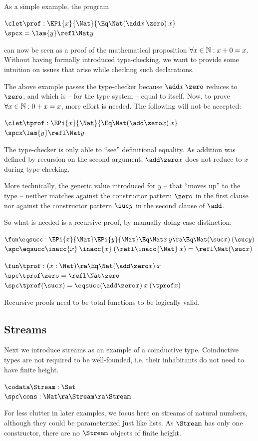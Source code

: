 \noindent As a simple example, the program
\begin{bsp}
$ \clet \prof : \EPi{x}{\Nat}{\Eq \Nat (\add x \: \zero)\: x} $ \\ 
$ \spcx = \lam{y}\refl \Nat y$ 
\end{bsp}
can now be seen as a proof of the mathematical proposition $ \forall x \in \mathbb{N} : x  + 0 = x $. Without having formally introduced type-checking, we want to provide some intuition on issues that arise while checking such declarations.

The above example passes the type-checker because $\add x \: \zero$ reduces to $\zero$, and which is -- for the type system -- equal to itself. 
Now, to prove $ \forall x \in \mathbb{N} : 0 +  x = x $, more effort is needed.
The following will not be accepted:
\begin{bsp}
$ \clet \tprof : \EPi{x}{\Nat}{\Eq \Nat (\add \zero x) \: x} $ \\ 
$ \spcx \lam{y} \refl \Nat y$ 
\end{bsp}
The type-checker is only able to ``see'' definitional equality.
As addition was defined by recursion on the second argument, $\add \zero x$ does not reduce to $x$ during type-checking.

More technically, the generic value introduced for $y$ -- that ``moves up'' to the type -- neither matches against the constructor pattern $\zero$ in the first clause
nor against the constructor pattern $\suc y$ in the second clause of $\add$.

So what is needed is a recursive proof, by manually doing case distinction:
\begin{bsp}
$\fun \eqsucc : \EPi{x}{\Nat}\EPi{y}{\Nat} \Eq \Nat x \: y \ra \Eq \Nat (\suc x) \: (\suc y)$ \\
$\spc \eqsucc \inacc{x} \: \inacc{x} \: (\refl \inacc{\Nat} \: x) = \refl \Nat (\suc x)$

$\fun \tprof : ( x : \Nat ) \ra \Eq \Nat (\add \zero x) \: x$\\
$\spc \tprof \zero = \refl \Nat \zero$\\
$\spc \tprof (\suc x) = \eqsucc (\add \zero x)\: x \: (\tprof x)$
\end{bsp}
Recursive proofs need to be total functions to be logically valid.

\subsection{Streams}
\label{lstream}
Next we introduce streams as an example of a coinductive type.
Coinductive types are not required to be well-founded, i.e. their inhabitants do not need to have finite height.
\begin{bsp}
$\codata \Stream : \Set $ \\
$\spc \cons : \Nat \ra \Stream \ra \Stream $
\end{bsp}
For less clutter in later examples, we focus here on streams of natural numbers, although they could be parameterized just like lists.
As $\Stream$ has only one constructor, there are no $\Stream$ objects of finite height.

